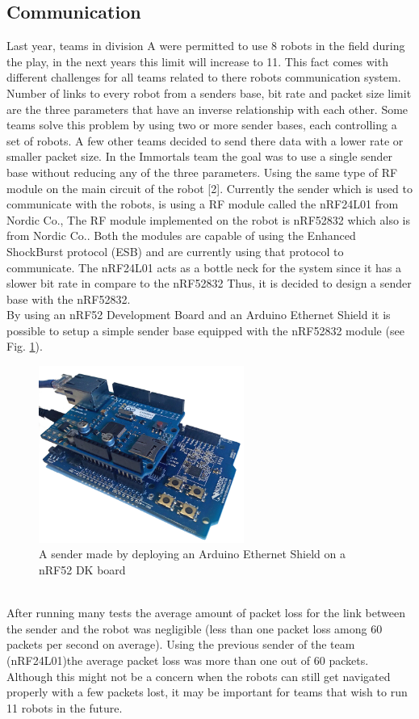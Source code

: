 \subsection{Communication}
Last year, teams in division A were permitted to use 8 robots in the field during the play, in the next years this limit will increase to 11. This fact comes with different challenges for all teams related to there robots communication system.\\
\indent Number of links to every robot from a senders base, bit rate and packet size limit are the three parameters that have an inverse relationship with each other. Some teams solve this problem by using two or more sender bases, each controlling a set of robots. A few other teams decided to send there data with a lower rate or smaller packet size. In the Immortals team the goal was to use a single sender base without reducing any of the three parameters. Using the same type of RF module on the main circuit of the robot [2]. Currently the sender which is used to communicate with the robots, is using a RF module called the nRF24L01 from Nordic Co., The RF module implemented on the robot is nRF52832 which also is from Nordic Co.. Both the modules are capable of using the Enhanced ShockBurst protocol (ESB) and are currently using that protocol to communicate. The nRF24L01 acts as a bottle neck for the system since it has a slower bit rate in compare to the nRF52832 Thus, it is decided to design a sender base with the nRF52832.\\
\indent By using an nRF52 Development Board and an Arduino Ethernet Shield it is possible to setup a simple sender base equipped with the nRF52832 module (see Fig. \ref{fig:SIMPLE_SENDER}).\\
\begin{figure}
	\centering
	\includegraphics[width=0.6\textwidth]{images/NRF52832DK_ETH.png}
	\caption{A sender made by deploying an Arduino Ethernet Shield on a nRF52 DK board}
	\label{fig:SIMPLE_SENDER}
\end{figure}\\
\indent After running many tests the average amount of packet loss for the link between the sender and the robot was negligible (less than one packet loss among 60 packets per second on average). Using the previous sender of the team (nRF24L01)the average packet loss was more than one out of 60 packets. Although this might not be a concern when the robots can still get navigated properly with a few packets lost, it may be important for teams that wish to run 11 robots in the future.\\

